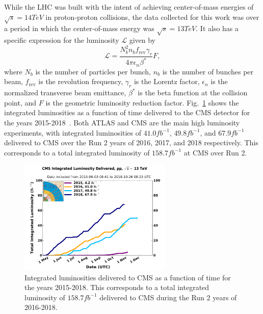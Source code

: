 While the LHC was built with the intent of achieving center-of-mass energies of $\sqrt{s}=14\unit{TeV}$ in proton-proton collisions, the data collected for this work was over a period in which the center-of-mass energy was $\sqrt{s}=13\unit{TeV}$.
It also has a specific expression for the luminosity $\mathcal{L}$ given by
\begin{equation}
  \mathcal{L}=\frac{N_b^2n_bf_\mathrm{rev}\gamma_r}{4\pi\epsilon_n\beta^*}F,
\end{equation}
where $N_b$ is the number of particles per bunch, $n_b$ is the number of bunches per beam, $f_\mathrm{rev}$ is the revolution frequency, $\gamma_r$ is the Lorentz factor, $\epsilon_n$ is the normalized transverse beam emittance, $\beta^*$ is the beta function at the collision point, and $F$ is the geometric luminosity reduction factor.
Fig.~\ref{fig:CMSlumi} shows the integrated luminosities as a function of time delivered to the CMS detector for the years 2015-2018~\cite{CMSlumi}.
Both ATLAS and CMS are the main high luminosity experiments, with integrated luminosities of $41.0\unit{fb^{-1}}$, $49.8\unit{fb^{-1}}$, and $67.9\unit{fb^{-1}}$ delivered to CMS over the Run 2 years of 2016, 2017, and 2018 respectively.
This corresponds to a total integrated luminosity of $158.7\unit{fb^{-1}}$ at CMS over Run 2.


\begin{figure}[htbp]
  \centering
  \includegraphics[width=0.65\textwidth]{fig/experiment/int_lumi_cumulative_pp_2_run2.pdf}
  \caption{
    Integrated luminosities delivered to CMS as a function of time for the years 2015-2018.
    This corresponds to a total integrated luminosity of $158.7\unit{fb^{-1}}$ delivered to CMS during the Run 2 years of 2016-2018.
  }
  \label{fig:CMSlumi}
\end{figure}

